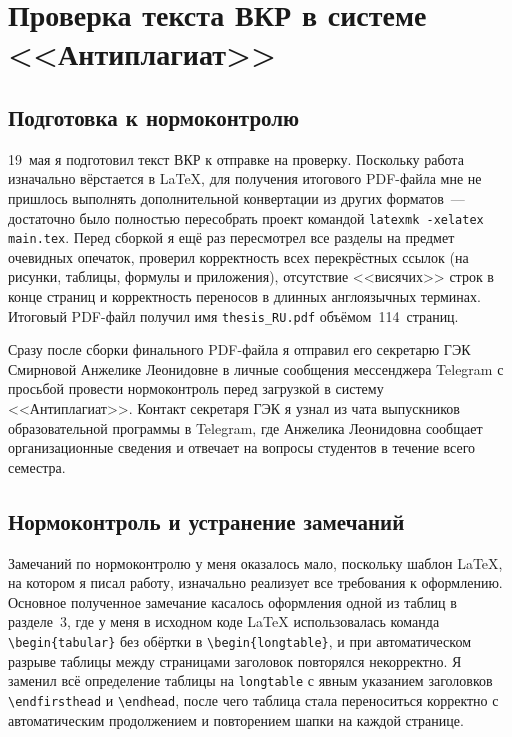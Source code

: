 \section{Проверка текста ВКР в системе <<Антиплагиат>>}

\subsection{Подготовка к нормоконтролю}

19~мая я подготовил текст ВКР к отправке на проверку. Поскольку
работа изначально вёрстается в \LaTeX{}, для получения итогового
PDF-файла мне не пришлось выполнять дополнительной конвертации
из других форматов~--- достаточно было полностью пересобрать
проект командой \texttt{latexmk -xelatex main.tex}. Перед
сборкой я ещё раз пересмотрел все разделы на предмет очевидных
опечаток, проверил корректность всех перекрёстных ссылок (на
рисунки, таблицы, формулы и приложения), отсутствие <<висячих>>
строк в конце страниц и корректность переносов в длинных
англоязычных терминах. Итоговый PDF-файл получил имя
\texttt{thesis\_RU.pdf} объёмом~114~страниц.

Сразу после сборки финального PDF-файла я отправил его
секретарю ГЭК Смирновой Анжелике Леонидовне в личные
сообщения мессенджера Telegram с просьбой провести
нормоконтроль перед загрузкой в систему <<Антиплагиат>>.
Контакт секретаря ГЭК я узнал из чата выпускников
образовательной программы в Telegram, где Анжелика Леонидовна
сообщает организационные сведения и отвечает на вопросы
студентов в течение всего семестра.

\subsection{Нормоконтроль и устранение замечаний}

Замечаний по нормоконтролю у меня оказалось мало, поскольку
шаблон \LaTeX{}, на котором я писал работу, изначально
реализует все требования к оформлению. Основное полученное
замечание касалось оформления одной из таблиц в разделе~3, где
у меня в исходном коде \LaTeX{} использовалась команда
\verb|\begin{tabular}| без обёртки в \verb|\begin{longtable}|, и
при автоматическом разрыве таблицы между страницами заголовок
повторялся некорректно. Я заменил всё определение таблицы на
\verb|longtable| с явным указанием заголовков
\verb|\endfirsthead| и \verb|\endhead|, после чего таблица стала
переноситься корректно с автоматическим продолжением и
повторением шапки на каждой странице.

